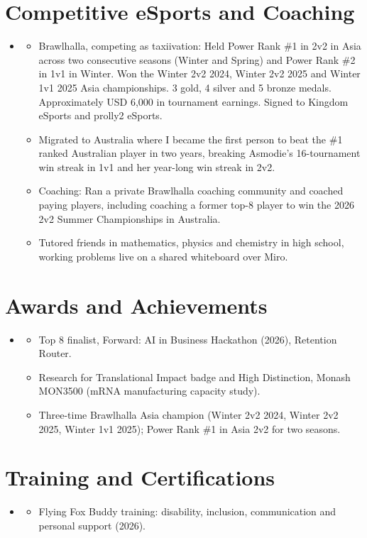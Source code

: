 \documentclass[letterpaper,11pt]{article}
\newcommand{\resumeItem}[1]{\item\small{{#1 \vspace{-2pt}}}}
\newcommand{\resumeSubHeadingListStart}{\begin{itemize}[leftmargin=0.15in, label={}]}
\newcommand{\resumeSubHeadingListEnd}{\end{itemize}}
\newcommand{\resumeItemListStart}{\begin{itemize}}
\newcommand{\resumeItemListEnd}{\end{itemize}\vspace{-5pt}}
\begin{document}
\section{Competitive eSports and Coaching}
  \resumeSubHeadingListStart
    \item[]
    \resumeItemListStart
      \resumeItem{Brawlhalla, competing as taxiivation: Held Power Rank \#1 in 2v2 in Asia across two consecutive seasons (Winter and Spring) and Power Rank \#2 in 1v1 in Winter. Won the Winter 2v2 2024, Winter 2v2 2025 and Winter 1v1 2025 Asia championships. 3 gold, 4 silver and 5 bronze medals. Approximately USD 6,000 in tournament earnings. Signed to Kingdom eSports and prolly2 eSports.}
      \resumeItem{Migrated to Australia where I became the first person to beat the \#1 ranked Australian player in two years, breaking Asmodie's 16-tournament win streak in 1v1 and her year-long win streak in 2v2.}
      \resumeItem{Coaching: Ran a private Brawlhalla coaching community and coached paying players, including coaching a former top-8 player to win the 2026 2v2 Summer Championships in Australia.}
      \resumeItem{Tutored friends in mathematics, physics and chemistry in high school, working problems live on a shared whiteboard over Miro.}
    \resumeItemListEnd
  \resumeSubHeadingListEnd

\section{Awards and Achievements}
  \resumeSubHeadingListStart
    \item[]
    \resumeItemListStart
      \resumeItem{Top 8 finalist, Forward: AI in Business Hackathon (2026), Retention Router.}
      \resumeItem{Research for Translational Impact badge and High Distinction, Monash MON3500 (mRNA manufacturing capacity study).}
      \resumeItem{Three-time Brawlhalla Asia champion (Winter 2v2 2024, Winter 2v2 2025, Winter 1v1 2025); Power Rank \#1 in Asia 2v2 for two seasons.}
    \resumeItemListEnd
  \resumeSubHeadingListEnd

\section{Training and Certifications}
  \resumeSubHeadingListStart
    \item[]
    \resumeItemListStart
      \resumeItem{Flying Fox Buddy training: disability, inclusion, communication and personal support (2026).}
    \resumeItemListEnd
  \resumeSubHeadingListEnd
\end{document}
